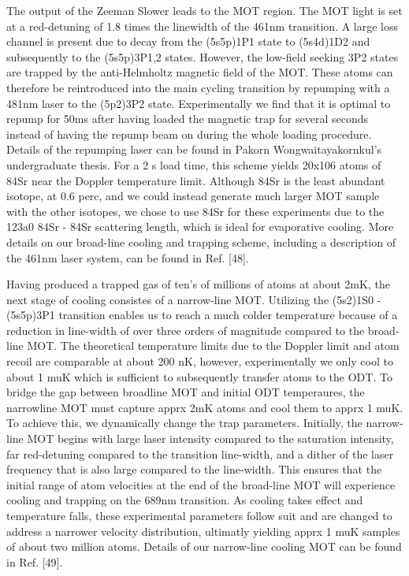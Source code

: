 The output of the Zeeman Slower leads to the MOT region. The MOT light is set at a red-detuning of 1.8 times the linewidth of the 461nm transition. 
A large loss channel is present due to decay from the (5s5p)1P1 state to (5s4d)1D2 and subsequently to the (5s5p)3P1,2 states. 
However, the low-field seeking 3P2 states are trapped by the anti-Helmholtz magnetic field of the MOT. 
These atoms can therefore be reintroduced into the main cycling transition by repumping with a 481nm laser to the (5p2)3P2 state. 
Experimentally we find that it is optimal to repump for 50ms after having loaded the magnetic trap for several seconds instead of having the repump beam on during the whole loading procedure. 
Details of the repumping laser can be found in Pakorn Wongwaitayakornkul’s undergraduate thesis. 
For a 2 s load time, this scheme yields 20x106 atoms of 84Sr near the Doppler temperature limit. 
Although 84Sr is the least abundant isotope, at 0.6 perc, and we could instead generate much larger MOT sample with the other isotopes, we chose to use 84Sr for these experiments due to the 123a0 84Sr - 84Sr scattering length, which is ideal for evaporative cooling. 
More details on our broad-line cooling and trapping scheme, including a description of the 461nm laser system, can be found in Ref. [48].

Having produced a trapped gas of ten’s of millions of atoms at about 2mK, the next stage of cooling consistes of a narrow-line MOT. 
Utilizing the (5s2)1S0 - (5s5p)3P1 transition enables us to reach a much colder temperature because of a reduction in line-width of over three orders of magnitude compared to the broad-line MOT. 
The theoretical temperature limits due to the Doppler limit and atom recoil are comparable at about 200 nK, however, experimentally we only cool to about 1 muK which is sufficient to subsequently transfer atoms to the ODT. 
To bridge the gap between broadline MOT and initial ODT temperaures, the narrowline MOT must capture apprx 2mK atoms and cool them to apprx 1 muK. To achieve this, we dynamically change the trap parameters. 
Initially, the narrow-line MOT begins with large laser intensity compared to the saturation intensity, far red-detuning compared to the transition line-width, and a dither of the laser frequency that is also large compared to the line-width. 
This ensures that the initial range of atom velocities at the end of the broad-line MOT will experience cooling and trapping on the 689nm transition. 
As cooling takes effect and temperature falls, these experimental parameters follow suit and are changed to address a narrower velocity distribution, ultimatly yielding apprx 1 muK samples of about two million atoms. 
Details of our narrow-line cooling MOT can be found in Ref. [49].

